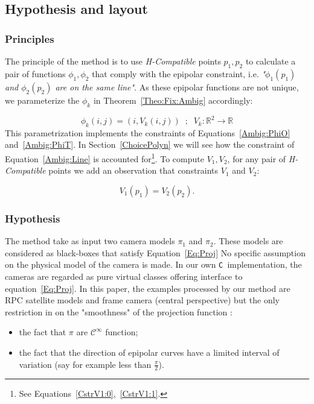\documentclass{ipol}
\newcommand{\CPP}{\mbox{\tt C\hspace{-0.05cm}\raisebox{0.2ex}{\small ++} }}
\newcommand{\RR}{\ensuremath{\mathbb{R}}}
\begin{document}
\subsection{Hypothesis and layout}

\subsubsection{Principles}
The principle of the method is to use \emph{H-Compatible}  points $p_1,p_2$ to calculate a
pair of functions $\phi_1,\phi_2$ that comply with the epipolar constraint, i.e. 
\emph{"$\phi_1(p_1)$ and $\phi_2(p_2)$ are on the same line"}. As these epipolar functions
are not unique, we parameterize the $\phi_k$ in Theorem~\ref{Theo:Fix:Ambig} accordingly:

\begin{equation}
    \phi_k(i,j) = (i,V_k(i,j))  \; \; ; \; \;
    V_k : \RR^2 \rightarrow \RR  
  \label{EpipVParam}
\end{equation}
%
This parametrization implements the constraints of Equations~\eqref{Ambig:PhiO} and~\ref{Ambig:PhiT}. In Section~\ref{ChoicePolyn} we will see how the constraint of Equation~\ref{Ambig:Line} is accounted for\footnote{See Equations~\eqref{CstrV1:0},~\eqref{CstrV1:1}.}. 
To compute $V_1,V_2$, for any pair of \emph{H-Compatible} points we add an observation that
constraints $V_1$ and $V_2$:


\begin{equation}
    V_1(p_1) = V_2(p_2) \label{EqV1V2}.
\end{equation}

\subsubsection{Hypothesis}


The method take as input two camera models $\pi_1$ and $\pi_2$.
These models are considered as black-boxes that satisfy Equation~\eqref{Eq:Proj} No specific assumption on the physical model of the camera is made. In our own \CPP implementation,
the cameras are regarded as pure virtual classes offering interface to equation~\eqref{Eq:Proj}.
In this paper, the examples processed by our method are RPC satellite models and frame camera (central perspective) but the
only restriction in on the "smoothness" of the projection function :

\begin{itemize}
    \item the fact that $\pi$ are   $\mathcal{C}^{\infty}$ function;
    \item the fact that the direction of epipolar curves have a limited interval of variation (say for example
          less than $\frac{\pi}{2}$).
\end{itemize}
\end{document}
